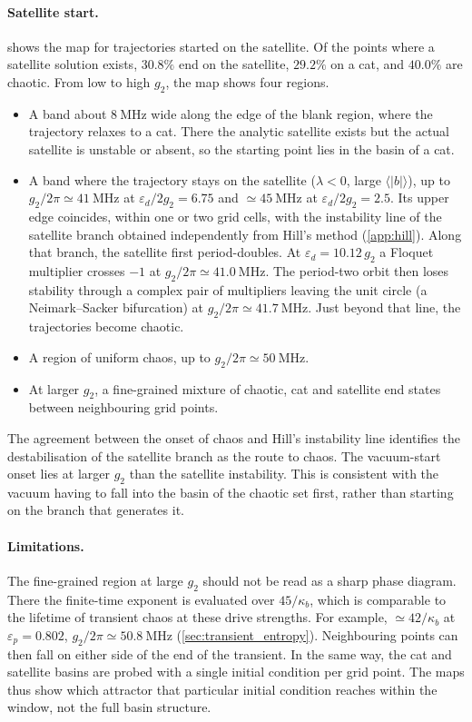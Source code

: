 \documentclass[aps,prx,reprint,floatfix,amsmath,amssymb,longbibliography]{revtex4-2}
\begin{document}
\paragraph*{Satellite start.}
\fi
{} shows the map for trajectories started on the satellite. Of the points where a satellite solution exists, $30.8\%$ end on the satellite, $29.2\%$ on a cat, and $40.0\%$ are chaotic. From low to high $g_2$, the map shows four regions.
\begin{itemize}
    \item A band about $8~\mathrm{MHz}$ wide along the edge of the blank region, where the trajectory relaxes to a cat. There the analytic satellite exists but the actual satellite is unstable or absent, so the starting point lies in the basin of a cat.
    \item A band where the trajectory stays on the satellite ($\lambda < 0$, large $\langle|b|\rangle$), up to $g_2/2\pi \simeq 41~\mathrm{MHz}$ at $\varepsilon_d/2g_2 = 6.75$ and $\simeq 45~\mathrm{MHz}$ at $\varepsilon_d/2g_2 = 2.5$. Its upper edge coincides, within one or two grid cells, with the instability line of the satellite branch obtained independently from Hill's method (\cref{app:hill}). Along that branch, the satellite first period-doubles. At $\varepsilon_d = 10.12\,g_2$ a Floquet multiplier crosses $-1$ at $g_2/2\pi \simeq 41.0~\mathrm{MHz}$. The period-two orbit then loses stability through a complex pair of multipliers leaving the unit circle (a Neimark--Sacker bifurcation) at $g_2/2\pi \simeq 41.7~\mathrm{MHz}$. Just beyond that line, the trajectories become chaotic.
    \item A region of uniform chaos, up to $g_2/2\pi \simeq 50~\mathrm{MHz}$.
    \item At larger $g_2$, a fine-grained mixture of chaotic, cat and satellite end states between neighbouring grid points.
\end{itemize}
The agreement between the onset of chaos and Hill's instability line identifies the destabilisation of the satellite branch as the route to chaos. The vacuum-start onset lies at larger $g_2$ than the satellite instability. This is consistent with the vacuum having to fall into the basin of the chaotic set first, rather than starting on the branch that generates it.

\paragraph*{Limitations.}
The fine-grained region at large $g_2$ should not be read as a sharp phase diagram. There the finite-time exponent is evaluated over $45/\kappa_b$, which is comparable to the lifetime of transient chaos at these drive strengths. For example, $\simeq 42/\kappa_b$ at $\varepsilon_p = 0.802$, $g_2/2\pi \simeq 50.8~\mathrm{MHz}$ (\cref{sec:transient_entropy}). Neighbouring points can then fall on either side of the end of the transient. In the same way, the cat and satellite basins are probed with a single initial condition per grid point. The maps thus show which attractor that particular initial condition reaches within the window, not the full basin structure.
\end{document}
